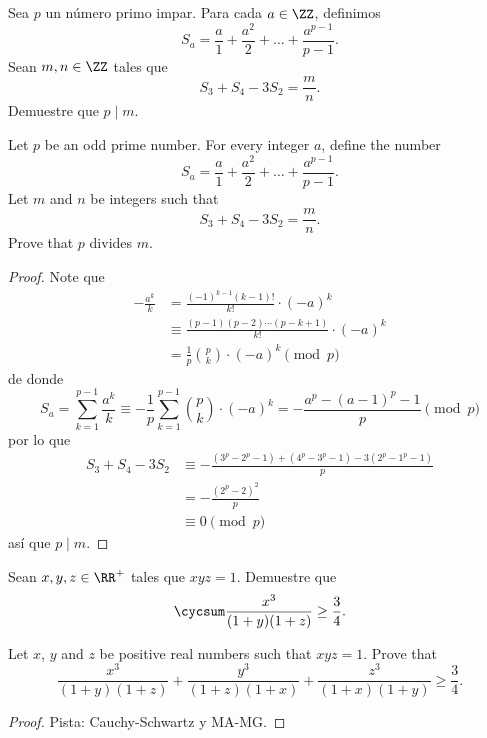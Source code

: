 \begin{probMG}[IMO 2011/N7]
	Sea $p$ un número primo impar. Para cada $a\in\ZZ$, definimos
	\[S_a=\frac{a}{1}+\frac{a^2}{2}+\dots+\frac{a^{p-1}}{p-1}.\]
	Sean $m,n\in\ZZ$ tales que
	\[S_3+S_4-3S_2=\frac mn.\]
	Demuestre que $p\mid m$.
	\begin{hint}
		Let $p$ be an odd prime number. For every integer $a$, define the number
		\[S_a=\frac{a}{1}+\frac{a^2}{2}+\dots+\frac{a^{p-1}}{p-1}.\]
		Let $m$ and $n$ be integers such that
		\[S_3+S_4-3S_2=\frac mn.\]
		Prove that $p$ divides $m$.
	\end{hint}
\end{probMG}

\begin{proof}
	Note que
	\begin{align*}
		-\frac{a^k}{k}
		&=\frac{(-1)^{k-1}(k-1)!}{k!}\cdot(-a)^k\\
		&\equiv\frac{(p-1)(p-2)\cdots(p-k+1)}{k!}\cdot(-a)^k\\
		&=\frac 1p\binom pk\cdot(-a)^k\pmod p
	\end{align*}
	de donde
	\[S_a=\sum_{k=1}^{p-1}\frac{a^k}{k}\equiv-\frac1p\sum_{k=1}^{p-1}\binom pk\cdot(-a)^k=-\frac{a^p-(a-1)^p-1}{p}\pmod p\]
	por lo que
	\begin{align*}
		S_3+S_4-3S_2
		&\equiv-\frac{(3^p-2^p-1)+(4^p-3^p-1)-3(2^p-1^p-1)}{p}\\
		&=-\frac{(2^p-2)^2}{p}\\
		&\equiv 0\pmod p
	\end{align*}
	así que $p\mid m$.
\end{proof}

\note[Álgebra]{}

\begin{probEG}[ISL 1998/A3]
	Sean $x,y,z\in\RR^+$ tales que $xyz=1$. Demuestre que
	\[\cycsum\frac{x^3}{(1+y)(1+z)}\ge\frac34.\]
	\begin{hint}
		Let $x$, $y$ and $z$ be positive real numbers such that $xyz=1$. Prove that
		\[\frac{x^3}{(1+y)(1+z)}+\frac{y^3}{(1+z)(1+x)}+\frac{z^3}{(1+x)(1+y)}\ge\frac34.\]
	\end{hint}
\end{probEG}

\begin{proof}
	Pista: Cauchy-Schwartz y MA-MG.
\end{proof}


